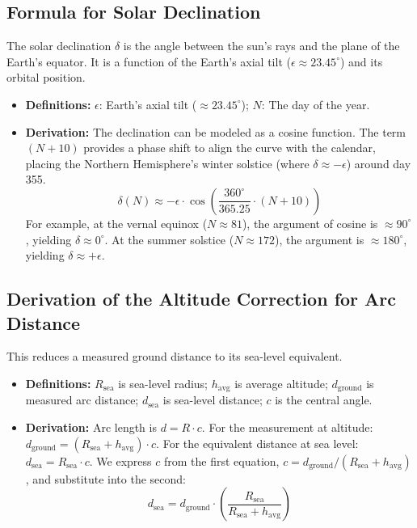 \documentclass[11pt]{article}
\begin{document}
\subsection{Formula for Solar Declination}
The solar declination $\delta$ is the angle between the sun's rays and the plane of the Earth's equator. It is a function of the Earth's axial tilt ($\epsilon \approx 23.45^{\circ}$) and its orbital position.
\begin{itemize}
    \item \textbf{Definitions:} $\epsilon$: Earth's axial tilt ($\approx 23.45^{\circ}$); $N$: The day of the year.
    \item \textbf{Derivation:} The declination can be modeled as a cosine function. The term $(N+10)$ provides a phase shift to align the curve with the calendar, placing the Northern Hemisphere's winter solstice (where $\delta \approx -\epsilon$) around day 355.
    \[
    \delta(N) \approx -\epsilon \cdot \cos\left( \frac{360^{\circ}}{365.25} \cdot (N + 10) \right)
    \]
    For example, at the vernal equinox ($N \approx 81$), the argument of cosine is $\approx 90^{\circ}$, yielding $\delta \approx 0^{\circ}$. At the summer solstice ($N \approx 172$), the argument is $\approx 180^{\circ}$, yielding $\delta \approx +\epsilon$.
\end{itemize}

\subsection{Derivation of the Altitude Correction for Arc Distance}
This reduces a measured ground distance to its sea-level equivalent.
\begin{itemize}
    \item \textbf{Definitions:} $R_{\text{sea}}$ is sea-level radius; $h_{\text{avg}}$ is average altitude; $d_{\text{ground}}$ is measured arc distance; $d_{\text{sea}}$ is sea-level distance; $c$ is the central angle.
    \item \textbf{Derivation:} Arc length is $d = R \cdot c$. For the measurement at altitude: $d_{\text{ground}} = (R_{\text{sea}} + h_{\text{avg}}) \cdot c$. For the equivalent distance at sea level: $d_{\text{sea}} = R_{\text{sea}} \cdot c$. We express $c$ from the first equation, $c = d_{\text{ground}} / (R_{\text{sea}} + h_{\text{avg}})$, and substitute into the second:
    \[
    d_{\text{sea}} = d_{\text{ground}} \cdot \left( \frac{R_{\text{sea}}}{R_{\text{sea}} + h_{\text{avg}}} \right)
    \]
\end{itemize}
\end{document}
